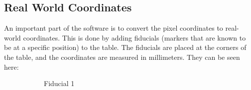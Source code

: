 \subsection{Real World Coordinates}\label{subsec:real-world-coordinates}
An important part of the software is to convert the pixel coordinates to real-world coordinates.
This is done by adding fiducials (markers that are known to be at a specific position) to the table.
The fiducials are placed at the corners of the table, and the coordinates are measured in millimeters.
They can be seen here:
\begin{figure}[H]
    \centering
    \begin{subfigure}{.2\textwidth}
        \centering
        \caption[originalRainbow]{Fiducial 1}
        \label{fig:fid_1}
    \end{subfigure}%
    \begin{subfigure}{.2\textwidth}
        \centering

\end{subfigure}
\end{figure}
